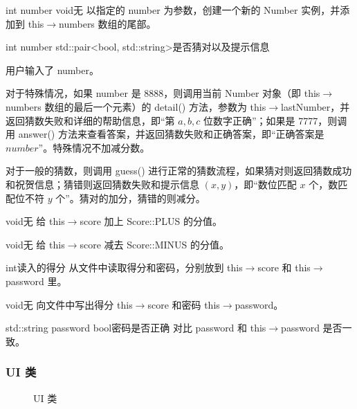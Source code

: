 {int number}
{void}{无}
{以指定的 number 为参数，创建一个新的 Number 实例，并添加到 this$\to$numbers 数组的尾部。}

{int number}
{std::pair<bool, std::string>}{是否猜对以及提示信息}
{用户输入了 number。

对于特殊情况，如果 number 是 8888，则调用当前 Number 对象（即 this$\to$numbers 数组的最后一个元素）的 detail() 方法，参数为 this$\to$lastNumber，并返回猜数失败和详细的帮助信息，即“第 $a,b,c$ 位数字正确”；如果是 7777，则调用 answer() 方法来查看答案，并返回猜数失败和正确答案，即“正确答案是 $number$”。特殊情况不加减分数。

对于一般的猜数，则调用 guess() 进行正常的猜数流程，如果猜对则返回猜数成功和祝贺信息；猜错则返回猜数失败和提示信息 $(x,y)$，即“数位匹配 $x$ 个，数匹配位不符 $y$ 个”。猜对的加分，猜错的则减分。}

{}
{void}{无}
{给 this$\to$score 加上 Score::PLUS 的分值。}

{}
{void}{无}
{给 this$\to$score 减去 Score::MINUS 的分值。}

{}
{int}{读入的得分}
{从文件中读取得分和密码，分别放到 this$\to$score 和 this$\to$password 里。}

{}
{void}{无}
{向文件中写出得分 this$\to$score 和密码 this$\to$password。}

{std::string password}
{bool}{密码是否正确}
{对比 password 和 this$\to$password 是否一致。}

\subsubsection{UI 类}

\begin{figure}[htp]
  \pictext\small
{}
  \caption{\label{UI}UI 类}
\end{figure}

